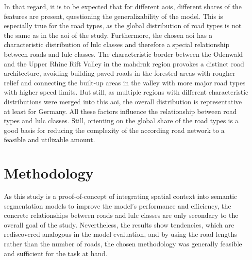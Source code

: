 In that regard, it is to be expected that for different \glspl{aoi}, different shares of the features are present, questioning the generalizability of the model. This is especially true for the road types, as the global distribution of road types is not the same as in the \gls{aoi} of the study. Furthermore, the chosen \gls{aoi} has a characteristic distribution of \gls{lulc} classes and therefore a special relationship between roads and \gls{lulc} classes. The characteristic border between the Odenwald and the Upper Rhine Rift Valley in the \gls{mahdrnk} region provokes a distinct road architecture, avoiding building paved roads in the forested areas with rougher relief and connecting the built-up areas in the valley with more major road types with higher speed limits. But still, as multiple regions with different characteristic distributions were merged into this \gls{aoi}, the overall distribution is representative at least for Germany. All these factors influence the relationship between road types and \gls{lulc} classes. Still, orienting on the global share of the road types is a good basis for reducing the complexity of the according road network to a feasible and utilizable amount.

\section{Methodology}

As this study is a proof-of-concept of integrating spatial context into semantic segmentation models to improve the model's performance and efficiency, the concrete relationships between roads and \gls{lulc} classes are only secondary to the overall goal of the study. Nevertheless, the results show tendencies, which are rediscovered analogous in the model evaluation, and by using the road lengths rather than the number of roads, the chosen methodology was generally feasible and sufficient for the task at hand.

